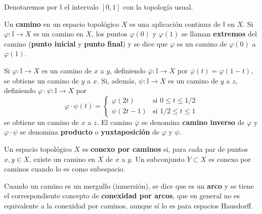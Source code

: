 \begin{observación}
    Denotaremos por $\mathbb{I}$ el intervalo $[0, 1]$ con la topología usual.
\end{observación}
\begin{definición}[Camino]
    Un \textbf{camino} en un espacio topológico $X$ es una aplicación continua de $\mathbb{I}$ en $X$. Si $\varphi \colon \mathbb{I} \to X$ es un camino en $X$, los puntos $\varphi(0)$ y $\varphi(1)$ se llaman \textbf{extremos} del camino (\textbf{punto inicial} y \textbf{punto final}) y se dice que $\varphi$ es un camino de $\varphi(0)$ a $\varphi(1)$.
\end{definición}
\begin{observación}
    Si $\varphi \colon \mathbb{I} \to X$ es un camino de $x$ a $y$, definiendo $\overline{\varphi} \colon \mathbb{I} \to X$ por $\overline{\varphi}(t) = \varphi(1 - t)$, se obtiene un camino de $y$ a $x$. Si, además, $\psi \colon \mathbb{I} \to X$ es un camino de $y$ a $z$, definiendo $\varphi \cdot \psi \colon \mathbb{I} \to X$ por
    $$\varphi \cdot \psi(t) = \begin{cases} \varphi(2t) & \text{si } 0 \leq t \leq 1/2 \\ \psi(2t - 1) & \text{si } 1/2 \leq t \leq 1 \end{cases}$$
    se obtiene un camino de $x$ a $z$. El camino $\overline{\varphi}$ se denomina \textbf{camino inverso} de $\varphi$ y $\varphi \cdot \psi$ se denomina \textbf{producto} o \textbf{yuxtaposición} de $\varphi$ y $\psi$.
\end{observación}
\begin{definición}
    Un espacio topológico $X$ es \textbf{conexo por caminos} si, para cada par de puntos $x, y \in X$, existe un camino en $X$ de $x$ a $y$. Un subconjunto $Y \subset X$ es conexo por caminos cuando lo es como subespacio.
\end{definición}
\begin{observación}
    Cuando un camino es un mergullo (inmersión), se dice que es un \textbf{arco} y se tiene el correspondiente concepto de \textbf{conexidad por arcos}, que en general no es equivalente a la conexidad por caminos, aunque sí lo es para espacios Hausdorff.
\end{observación}

